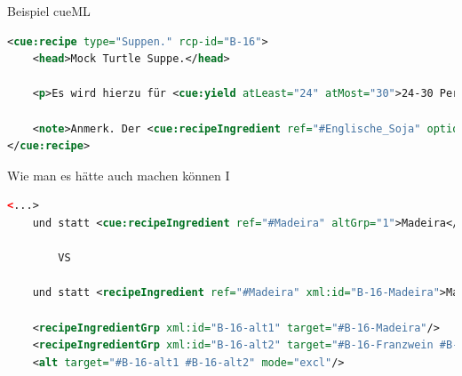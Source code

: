 \documentclass[12pt]{beamer}
\begin{document}
\begin{frame}[fragile]{Beispiel cueML}
	\begin{lstlisting}[language=XML]
<cue:recipe type="Suppen." rcp-id="B-16">
	<head>Mock Turtle Suppe.</head>
	
	<p>Es wird hierzu für <cue:yield atLeast="24" atMost="30">24-30 Personen</cue:yield> eine kräftige <ref target="#Bouillon">Bouillon</ref> von 8-10 Pfund <cue:recipeIngredient ref="#Rindkochfleisch" atLeast="8" atMost="10" unit="Pfund">Rindfleisch</cue:recipeIngredient> mit <cue:recipeIngredient ref="#Wurzelwerk">Wurzelwerk </cue:recipeIngredient> gekocht. [...]</p>
	
	<note>Anmerk. Der <cue:recipeIngredient ref="#Englische_Soja" optional="True">Soja</cue:recipeIngredient> macht die Suppe gewürzreicher, kann jedoch gut wegbleiben, und statt <cue:recipeIngredient ref="#Madeira" altGrp="1">Madeira</cue:recipeIngredient> kann man <cue:recipeIngredient ref="weißen_Franzwein" altGrp="2">weißen Franzwein</cue:recipeIngredient> und etwas <cue:recipeIngredient ref="#Rum" altGrp="2" quantity="etwas">Rum</cue:recipeIngredient> nehmen<cue:alt target="1 2"/>. Sowohl die Bouillon als Kalbskopf können schon am vorhergehenden Tage, ohne Nachtheil der Suppe, gekocht werden.</note>
</cue:recipe>
	\end{lstlisting}
\end{frame}

\begin{frame}[fragile]{Wie man es hätte auch machen können I}
	\begin{lstlisting}[language=XML]
	<...>
	und statt <cue:recipeIngredient ref="#Madeira" altGrp="1">Madeira</cue:recipeIngredient> kann man <cue:recipeIngredient ref="weißen_Franzwein" altGrp="2">weißen Franzwein</cue:recipeIngredient> und etwas <cue:recipeIngredient ref="#Rum" altGrp="2" quantity="etwas">Rum</cue:recipeIngredient> nehmen <cue:alt target="1 2"/>.
	
		VS
	
	und statt <recipeIngredient ref="#Madeira" xml:id="B-16-Madeira">Madeira</recipeIngredient> kann man <recipeIngredient ref="weißen_Franzwein" xml:id="B-16-Franzwein">weißen Franzwein</recipeIngredient> und etwas <recipeIngredient ref="#Rum" xml:id="B-16-Rum">Rum</recipeIngredient> nehmen. Sowohl die Bouillon als Kalbskopf können schon am vorhergehenden Tage, ohne Nachtheil der Suppe, gekocht werden.
	
	<recipeIngredientGrp xml:id="B-16-alt1" target="#B-16-Madeira"/>
	<recipeIngredientGrp xml:id="B-16-alt2" target="#B-16-Franzwein #B-16-Rum"/>
	<alt target="#B-16-alt1 #B-16-alt2" mode="excl"/>
	\end{lstlisting}
\end{frame}
\end{document}
